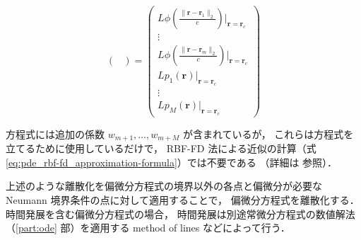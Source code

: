 \begin{equation}
\begin{pmatrix}
    \end{pmatrix}
    =
    \begin{pmatrix}
        L \phi\left(\frac{\|\bm{r} - \bm{r}_1\|_2}{c}\right) |_{\bm{r} = \bm{r}_c} \\
        \vdots                                                                     \\
        L \phi\left(\frac{\|\bm{r} - \bm{r}_m\|_2}{c}\right) |_{\bm{r} = \bm{r}_c} \\
        L p_1(\bm{r}) |_{\bm{r} = \bm{r}_c}                                        \\
        \vdots                                                                     \\
        L p_M(\bm{r}) |_{\bm{r} = \bm{r}_c}
    \end{pmatrix}
\end{equation}

方程式には追加の係数 $w_{m+1}, \ldots, w_{m+M}$ が含まれているが，
これらは方程式を立てるために使用しているだけで，
RBF-FD 法による近似の計算（式 \eqref{eq:pde_rbf-fd_approximation-formula}）では不要である
（詳細は \cite{Fornberg2015} 参照）．

上述のような離散化を偏微分方程式の境界以外の各点と偏微分が必要な Neumann 境界条件の点に対して適用することで，
偏微分方程式を離散化する．
時間発展を含む偏微分方程式の場合，
時間発展は別途常微分方程式の数値解法（\ref{part:ode} 部）を適用する method of lines などによって行う．
